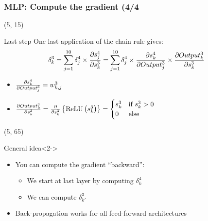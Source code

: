 \begin{frame}
  \frametitle{\acl{MLP}: Compute the gradient (4/4}

  \begin{textblock}{90}(5, 15)
    \begin{block}{Last step}
      One last application of the chain rule gives:
      \[
        \delta_k^3 =
        \sum_{j=1}^{10} \delta_{j}^{4} \times
        \frac{\partial s_{j}^4}{\partial s_{k}^3} =
        \sum_{j=1}^{10} \delta_{j}^{4} \times
        \frac{\partial s_{k}^4}{\partial Output_{j}^{3}} \times
        \frac{\partial Output_{k}^{3}}{\partial s_{k}^3}
      \]
      \begin{itemize}
      \item $\frac{\partial s_{k}^4}{\partial Output_{j}^{3}} = w_{k,j}^{3}$
      \item $\frac{\partial Output_{k}^{3}}{\partial s_{k}^3} =
        \frac{\partial }{\partial s_{k}^3} \left\lbrace \mathrm{ReLU} \left ( {s_{k}^3} \right )
        \right\rbrace =
        \begin{cases}
          s_{k}^3 & \text{if $s_{k}^3 > 0$}\\
          0 & \text{else}
        \end{cases}
        $
      \end{itemize}
    \end{block}
  \end{textblock}

  \begin{textblock}{90}(5, 65)
    \begin{block}{General idea}<2->
      \begin{itemize}
      \item You can compute the gradient ``backward'':
        \begin{itemize}
        \item We start at last layer by computing $\delta_k^4$
        \item We can compute $\delta_{k'}^3$
        \end{itemize}
      \item<2-> Back-propagation works for all feed-forward architectures
        \hyperlink{MLP_Learning_2}{}
      \end{itemize}
    \end{block}
  \end{textblock}
\end{frame}
